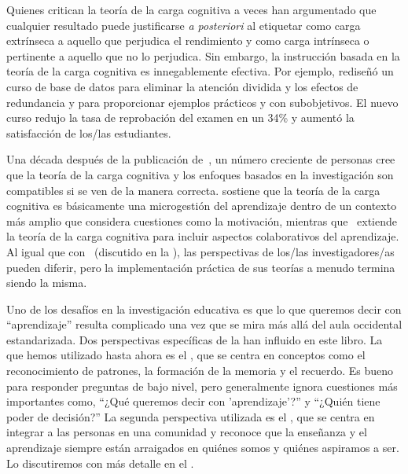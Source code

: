 
Quienes critican la teoría de la carga cognitiva a veces han argumentado que
cualquier resultado puede justificarse \emph{a posteriori} al etiquetar como carga extrínseca a
aquello que perjudica el rendimiento 
y como carga intrínseca o pertinente a aquello que no lo perjudica.
Sin embargo,
la instrucción basada en la teoría de la carga cognitiva es innegablemente efectiva.
Por ejemplo,
\cite{Maso2016} rediseñó un curso de base de datos para eliminar la atención dividida y los efectos de redundancia
y para proporcionar ejemplos prácticos y con sub\-objetivos.
El nuevo curso redujo la tasa de reprobación del examen en un 34\%
y aumentó la satisfacción de los/las estudiantes.

Una década después de la publicación de~\cite{Kirs2006},
un número creciente de personas cree que la teoría de la carga cognitiva y los enfoques basados en la investigación son compatibles
si se ven de la manera correcta.
\cite{Kaly2015} sostiene que la teoría de la carga cognitiva es básicamente una microgestión del aprendizaje
dentro de un contexto más amplio que considera cuestiones como la motivación,
mientras que~\cite{Kirs2018} extiende la teoría de la carga cognitiva para incluir aspectos colaborativos del aprendizaje.
Al igual que con~\cite{Mark2018} (discutido en la ),
las perspectivas de los/las investigadores/as pueden diferir,
pero la implementación práctica de sus teorías a menudo termina siendo la misma.

Uno de los desafíos en la investigación educativa es que
lo que queremos decir con ``aprendizaje'' resulta complicado
una vez que se mira más allá del aula occidental estandarizada.
Dos perspectivas específicas de la  han influido en este libro.
La que hemos utilizado hasta ahora es el ,
que se centra en conceptos como el reconocimiento de patrones, la formación de la memoria y el recuerdo.
Es bueno para responder preguntas de bajo nivel,
pero generalmente ignora cuestiones más importantes como,
``¿Qué queremos decir con 'aprendizaje'?'' y
``¿Quién tiene poder de decisión?''
La segunda perspectiva utilizada es el ,
que se centra en integrar a las personas en una comunidad
y reconoce que
la enseñanza y el aprendizaje siempre están arraigados en quiénes somos y quiénes aspiramos a ser.
Lo discutiremos con más detalle en el .


